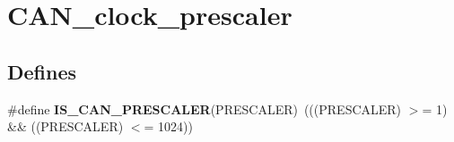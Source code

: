 \hypertarget{group__CAN__clock__prescaler}{
\section{CAN\_\-clock\_\-prescaler}
\label{group__CAN__clock__prescaler}
}
\subsection*{Defines}
\begin{DoxyCompactItemize}
\item 
\hypertarget{group__CAN__clock__prescaler_gacde6b8be6fe083a6302fc183b5ac1055}{
\#define {\bfseries IS\_\-CAN\_\-PRESCALER}(PRESCALER)~(((PRESCALER) $>$= 1) \&\& ((PRESCALER) $<$= 1024))}
\label{group__CAN__clock__prescaler_gacde6b8be6fe083a6302fc183b5ac1055}

\end{DoxyCompactItemize}
